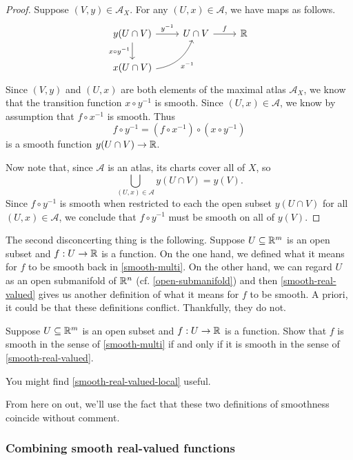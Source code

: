 \begin{proof}
	Suppose $(V, y) \in \mathscr{A}_X$. For any $(U, x) \in \mathscr{A}$, we have maps as follows.
	\[ \begin{tikzcd} y(U \cap V) \ar{r}{y^{-1}} \ar{d}[swap]{x \circ y^{-1}} & U \cap V \ar{r}{f} & \R \\ x(U \cap V) \ar[bend right]{ur}[swap]{x^{-1}} \end{tikzcd} \]
	Since $(V, y)$ and $(U, x)$ are both elements of the maximal atlas $\mathscr{A}_X$, we know that the transition function $x \circ y^{-1}$ is smooth. Since $(U, x) \in \mathscr{A}$, we know by assumption that $f \circ x^{-1}$ is smooth. Thus \[ f \circ y^{-1} = (f \circ x^{-1}) \circ (x \circ y^{-1}) \]
	is a smooth function $y(U \cap V) \to \mathbb{R}$. 
	
	Now note that, since $\mathscr{A}$ is an atlas, its charts cover all of $X$, so
	\[ \bigcup_{(U,x) \in \mathscr{A}} y(U \cap V) = y(V). \]
	Since $f \circ y^{-1}$ is smooth when restricted to each the open subset $y(U \cap V)$ for all $(U, x) \in \mathscr{A}$, we conclude that $f \circ y^{-1}$ must be smooth on all of $y(V)$.
\end{proof}

The second disconcerting thing is the following. Suppose $U \subseteq \mathbb{R}^m$ is an open subset and $f : U \to \mathbb{R}$ is a function. On the one hand, we defined what it means for $f$ to be smooth back in \cref{smooth-multi}. On the other hand, we can regard $U$ as an open submanifold of $\mathbb{R}^n$ (cf. \cref{open-submanifold}) and then \cref{smooth-real-valued} gives us another definition of what it means for $f$ to be smooth. A priori, it could be that these definitions conflict. Thankfully, they do not. 

\begin{exercise}
	Suppose $U \subseteq \mathbb{R}^m$ is an open subset and $f : U \to \mathbb{R}$ is a function. Show that $f$ is smooth in the sense of \cref{smooth-multi} if and only if it is smooth in the sense of \cref{smooth-real-valued}. 
	\begin{hint}
		You might find \cref{smooth-real-valued-local} useful. 
	\end{hint}
\end{exercise}

From here on out, we'll use the fact that these two definitions of smoothness coincide without comment. 

\subsubsection*{Combining smooth real-valued functions}

